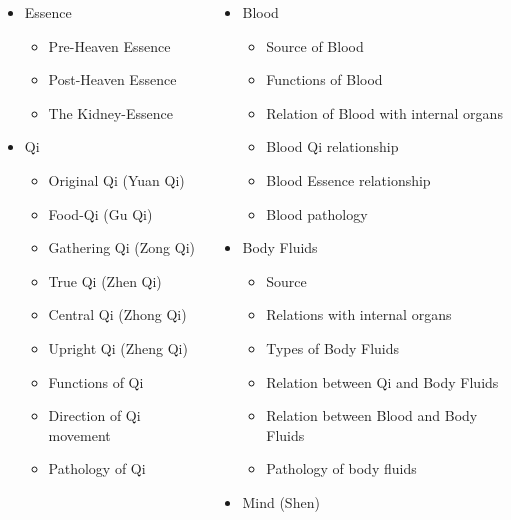 \documentclass[
	11pt, %
]{beamer}
\theoremstyle{newblock}
\begin{document}
\begin{frame}[plain]
	\begin{columns}[T]
		\begin{itemize}
			\item Essence
			\begin{itemize}
				\item Pre-Heaven Essence
				\item Post-Heaven Essence
				\item The Kidney-Essence
			\end{itemize}
			\item Qi
			\begin{itemize}
				\item Original Qi (Yuan Qi)
				\item Food-Qi (Gu Qi)
				\item Gathering Qi (Zong Qi)
				\item True Qi (Zhen Qi)
				\item Central Qi (Zhong Qi)
				\item Upright Qi (Zheng Qi)
				\item Functions of Qi
				\item Direction of Qi movement
				\item Pathology of Qi
			\end{itemize}
		\end{itemize}
		\begin{itemize}
			\item Blood
			\begin{itemize}
				\item Source of Blood
				\item Functions of Blood
				\item Relation of Blood with internal organs
				\item Blood Qi relationship
				\item Blood Essence relationship
				\item Blood pathology
			\end{itemize}
			\item Body Fluids
			\begin{itemize}
				\item Source
				\item Relations with internal organs
				\item Types of Body Fluids
				\item Relation between Qi and Body Fluids
				\item Relation between Blood and Body Fluids
				\item Pathology of body fluids
			\end{itemize}
			\item Mind (Shen)
		\end{itemize}
	\end{columns}
\end{frame}
\end{document}
